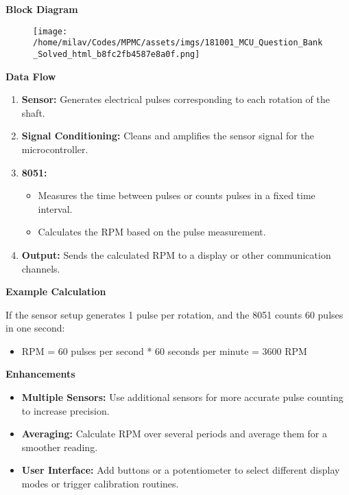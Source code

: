 \documentclass[
]{article}
\begin{document}
\textbf{Block Diagram}

\begin{figure}
\centering
\texttt{[image: /home/milav/Codes/MPMC/assets/imgs/181001\_MCU\_Question\_Bank\_Solved\_html\_b8fc2fb4587e8a0f.png]}
\caption{}
\end{figure}

\textbf{Data Flow}

\begin{enumerate}
\def\labelenumi{\arabic{enumi}.}
\item
  \textbf{Sensor:} Generates electrical pulses corresponding to each
  rotation of the shaft.
\item
  \textbf{Signal Conditioning:} Cleans and amplifies the sensor signal
  for the microcontroller.
\item
  \textbf{8051:}

  \begin{itemize}
  \item
    Measures the time between pulses or counts pulses in a fixed time
    interval.
  \item
    Calculates the RPM based on the pulse measurement.
  \end{itemize}
\item
  \textbf{Output:} Sends the calculated RPM to a display or other
  communication channels.
\end{enumerate}

\textbf{Example Calculation}

If the sensor setup generates 1 pulse per rotation, and the 8051 counts
60 pulses in one second:

\begin{itemize}
\item
  RPM = 60 pulses per second * 60 seconds per minute = 3600 RPM
\end{itemize}

\textbf{Enhancements}

\begin{itemize}
\item
  \textbf{Multiple Sensors:} Use additional sensors for more accurate
  pulse counting to increase precision.
\item
  \textbf{Averaging:} Calculate RPM over several periods and average
  them for a smoother reading.
\item
  \textbf{User Interface:} Add buttons or a potentiometer to select
  different display modes or trigger calibration routines.
\end{itemize}
\end{document}
